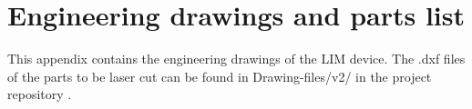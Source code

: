 \chapter{Engineering drawings and parts list}

This appendix contains the engineering drawings of the LIM device. The .dxf files of the parts to be laser cut can be found in Drawing-files/v2/ in the project repository \citep{repo}.





